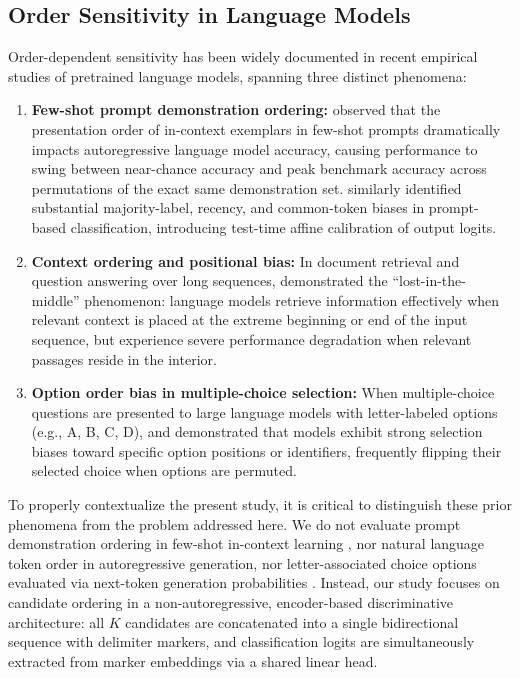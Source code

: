 \documentclass[11pt,a4paper]{article}
\begin{document}
\subsection{Order Sensitivity in Language Models}
Order-dependent sensitivity has been widely documented in recent empirical studies of pretrained language models, spanning three distinct phenomena:
\begin{enumerate}
    \item \textbf{Few-shot prompt demonstration ordering:} \citet{lu2022fantastically} observed that the presentation order of in-context exemplars in few-shot prompts dramatically impacts autoregressive language model accuracy, causing performance to swing between near-chance accuracy and peak benchmark accuracy across permutations of the exact same demonstration set. \citet{zhao2021calibrate} similarly identified substantial majority-label, recency, and common-token biases in prompt-based classification, introducing test-time affine calibration of output logits.
    \item \textbf{Context ordering and positional bias:} In document retrieval and question answering over long sequences, \citet{liu2024lost} demonstrated the ``lost-in-the-middle'' phenomenon: language models retrieve information effectively when relevant context is placed at the extreme beginning or end of the input sequence, but experience severe performance degradation when relevant passages reside in the interior.
    \item \textbf{Option order bias in multiple-choice selection:} When multiple-choice questions are presented to large language models with letter-labeled options (e.g., A, B, C, D), \citet{pezeshkpour2024large} and \citet{zheng2024large} demonstrated that models exhibit strong selection biases toward specific option positions or identifiers, frequently flipping their selected choice when options are permuted.
\end{enumerate}

To properly contextualize the present study, it is critical to distinguish these prior phenomena from the problem addressed here. We do not evaluate prompt demonstration ordering in few-shot in-context learning \citep{lu2022fantastically}, nor natural language token order in autoregressive generation, nor letter-associated choice options evaluated via next-token generation probabilities \citep{pezeshkpour2024large, zheng2024large}. Instead, our study focuses on candidate ordering in a non-autoregressive, encoder-based discriminative architecture: all $K$ candidates are concatenated into a single bidirectional sequence with delimiter markers, and classification logits are simultaneously extracted from marker embeddings via a shared linear head.
\end{document}
